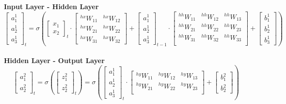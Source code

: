 \documentclass[12pt]{article}
\begin{document}
\textbf{Input Layer - Hidden Layer}
\begin{equation}
\begin{bmatrix}
a_{1}^{1}\\
a_{2}^{1}\\
a_{3}^{1}
\end{bmatrix}_{t}
=
\sigma
\left(
\begin{bmatrix}
x_{1}\\
x_{2}
\end{bmatrix}_{t}
\cdot
\begin{bmatrix}
{}^{hx}W_{11} & {}^{hx}W_{12}\\
{}^{hx}W_{21} & {}^{hx}W_{22}\\
{}^{hx}W_{31} & {}^{hx}W_{32}
\end{bmatrix}
 +
\begin{bmatrix}
a_{1}^{1}\\
a_{2}^{1}\\
a_{3}^{1}
\end{bmatrix}_{t-1}
\cdot
\begin{bmatrix}
{}^{hh}W_{11} & {}^{hh}W_{12} & {}^{hh}W_{13}\\
{}^{hh}W_{21} & {}^{hh}W_{22} & {}^{hh}W_{23}\\
{}^{hh}W_{31} & {}^{hh}W_{32} & {}^{hh}W_{33}\\
\end{bmatrix}
 +
 \begin{bmatrix}
b_{1}^{1}\\
b_{2}^{1}\\
b_{3}^{1}
\end{bmatrix}
\right)
\end{equation}
\\

\textbf{Hidden Layer - Output Layer}
\begin{equation}
\begin{bmatrix}
a_{1}^{2}\\
a_{2}^{2}
\end{bmatrix}_{t}
=
\sigma
\left(
\begin{bmatrix}
z_{1}^{2}\\
z_{2}^{2}
\end{bmatrix}_{t}
\right)
=
\sigma
\left(
\begin{bmatrix}
a_{1}^{1}\\
a_{2}^{1}\\
a_{3}^{1}
\end{bmatrix}_{t}
\cdot
\begin{bmatrix}
{}^{hy}W_{11} & {}^{hy}W_{12} & {}^{hy}W_{13} \\
{}^{hy}W_{21} & {}^{hy}W_{22} & {}^{hy}W_{23} \\ 
\end{bmatrix}
 +
 \begin{bmatrix}
b_{1}^{2}\\
b_{2}^{2}
\end{bmatrix}
\right)
\end{equation}
\end{document}
